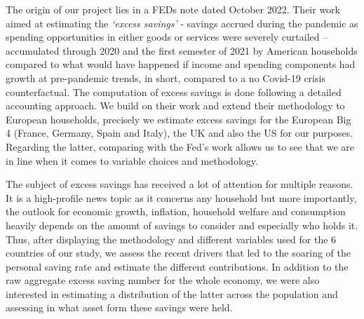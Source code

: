 \quad The origin of our project lies in a FEDs note dated October 2022\cite{savingsfed}. Their work aimed at estimating the \textit{‘excess savings’} - savings accrued during the pandemic as spending opportunities in either goods or services were severely curtailed – accumulated through 2020 and the first semester of 2021 by American households compared to what would have happened if income and spending components had growth at pre-pandemic trends, in short, compared to a no Covid-19 crisis counterfactual. The computation of excess savings is done following a detailed accounting approach. We build on their work and extend their methodology to European households, precisely we estimate excess savings for the European Big 4 (France, Germany, Spain and Italy), the UK and also the US for our purposes. Regarding the latter, comparing with the Fed’s work allows us to see that we are in line when it comes to variable choices and methodology.\par
The subject of excess savings has received a lot of attention for multiple reasons. It is a high-profile news topic as it concerns any household but more importantly, the outlook for economic growth, inflation, household welfare and consumption heavily depends on the amount of savings to consider and especially who holds it. Thus, after displaying the methodology and different variables used for the 6 countries of our study, we assess the recent drivers that led to the soaring of the personal saving rate and estimate the different contributions. In addition to the raw aggregate excess saving number for the whole economy, we were also interested in estimating a distribution of the latter across the population and assessing in what asset form these savings were held.

